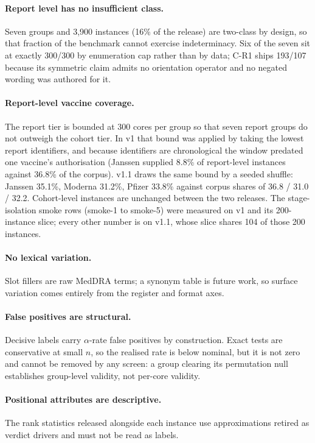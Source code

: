 \paragraph{Report level has no insufficient class.} Seven groups and 3{,}900
instances (16\% of the release) are two-class by design, so that fraction of the
benchmark cannot exercise indeterminacy. Six of the seven sit at exactly 300/300
by enumeration cap rather than by data; C-R1 ships 193/107 because its symmetric
claim admits no orientation operator and no negated wording was authored for it.

\paragraph{Report-level vaccine coverage.} The report tier is bounded at 300
cores per group so that seven report groups do not outweigh the cohort tier. In
v1 that bound was applied by taking the lowest report identifiers, and because
identifiers are chronological the window predated one vaccine's authorisation
(Janssen supplied 8.8\% of report-level instances against 36.8\% of the
corpus). v1.1 draws the same bound by a seeded shuffle: Janssen 35.1\%, Moderna
31.2\%, Pfizer 33.8\% against corpus shares of 36.8 / 31.0 / 32.2. Cohort-level
instances are unchanged between the two releases. The stage-isolation smoke rows
(smoke-1 to smoke-5) were measured on v1 and its 200-instance slice; every other
number is on v1.1, whose slice shares 104 of those 200 instances.

\paragraph{No lexical variation.} Slot fillers are raw MedDRA terms; a synonym
table is future work, so surface variation comes entirely from the register and
format axes.

\paragraph{False positives are structural.} Decisive labels carry
$\alpha$-rate false positives by construction. Exact tests are conservative at
small $n$, so the realised rate is below nominal, but it is not zero and cannot be
removed by any screen: a group clearing its permutation null establishes
group-level validity, not per-core validity.

\paragraph{Positional attributes are descriptive.} The rank statistics released
alongside each instance use approximations retired as verdict drivers and must
not be read as labels.


